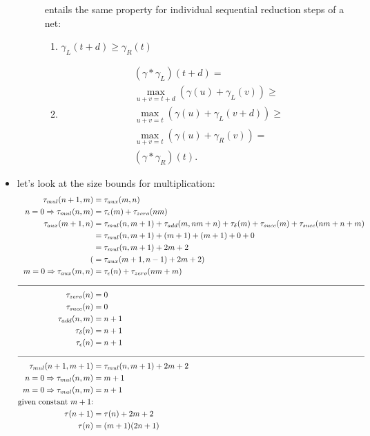 \documentclass{fit-teorsem}
\begin{document}
\begin{itemize}
\begin{description}
				entails the same property for individual sequential reduction steps of a net:
				\begin{enumerate}
					\item $\gamma_L (t + d) \ge \gamma_R (t)$
					\item \begin{align*}
							& (\gamma \ast \gamma_L) (t + d) = \\
							& \max_{u + v = t + d} (\gamma(u) + \gamma_L(v)) \ge \\
							& \max_{u + v = t} (\gamma(u) + \gamma_L(v + d)) \ge \\
							& \max_{u + v = t} (\gamma(u) + \gamma_R(v)) = \\
							& (\gamma \ast \gamma_R)(t)
						.\end{align*}
				\end{enumerate}
		\end{description}
	\item let's look at the size bounds for multiplication:
		\begin{align*}
			\tau_{mul}(n + 1, m) & = \tau_{aux}(m, n) \\
			n = 0 \Rightarrow \tau_{mul}(n, m) & = \tau_{\epsilon}(m) + \tau_{zero}(n m) \\
			\tau_{aux}(m + 1, n) & = \tau_{mul}(n, m + 1) + \tau_{add}(m, n m + n) + \tau_{\delta}(m)
				+ \tau_{succ}(m) + \tau_{succ}(n m + n + m) \\
								 & = \tau_{mul}(n, m + 1) + (m + 1) + (m + 1) + 0 + 0 \\
								 & = \tau_{mul}(n, m + 1) + 2m + 2 \\
								(& = \tau_{aux}(m + 1, n - 1) + 2m + 2) \\
			m = 0 \Rightarrow \tau_{aux}(m, n) & = \tau_{\epsilon}(n) + \tau_{zero}(n m + m) \\
			\cline{1-2}
			\tau_{zero}(n) & = 0 \\
			\tau_{succ}(n) & = 0 \\
			\tau_{add}(n, m) & = n + 1 \\
			\tau_{\delta}(n) & = n + 1 \\
			\tau_{\epsilon}(n) & = n + 1 \\
			\cline{1-2}
			\tau_{mul}(n + 1, m + 1) & = \tau_{mul}(n, m + 1) + 2m + 2 \\
			n = 0 \Rightarrow \tau_{mul}(n, m) & = m + 1 \\
			m = 0 \Rightarrow \tau_{mul}(n, m) & = n + 1 \\
			\text{given constant $m + 1$:} \\
			\tau(n + 1) & = \tau(n) + 2m + 2 \\
			\tau(n) & = (m + 1)(2n + 1)
		\end{align*}


\end{itemize}
\end{document}

